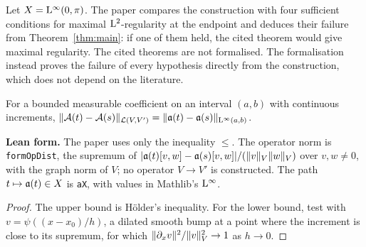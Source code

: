 Let $X=\mathrm{L}^\infty(0,\pi)$.  The paper compares the construction with four sufficient conditions
for maximal $\mathrm{L}^2$-regularity at the endpoint and deduces their failure from
Theorem~\ref{thm:main}: if one of them held, the cited theorem would give maximal regularity.
The cited theorems are not formalised.  The formalisation instead proves the failure of every
hypothesis directly from the construction, which does not depend on the literature.

\begin{lemma}
  \label{lem:opnorm}
  \leanok
  For a bounded measurable coefficient on an interval $(a,b)$ with continuous increments,
  $\lVert \mathcal{A}(t)-\mathcal{A}(s)\rVert_{\mathcal{L}(V,V')}=\lVert \mathfrak{a}(t)-\mathfrak{a}(s)\rVert_{\mathrm{L}^\infty(a,b)}$.
\end{lemma}

\textbf{Lean form.}  The paper uses only the inequality $\leq$.  The operator norm is
\texttt{formOpDist}, the supremum of
$\lvert \mathfrak{a}(t)[v,w]-\mathfrak{a}(s)[v,w]\rvert/(\lVert v\rVert_V\lVert w\rVert_V)$ over $v,w\neq0$, with the graph norm of
$V$; no operator $V\to V'$ is constructed.  The path $t\mapsto\mathfrak{a}(t)\in X$ is \texttt{aX}, with
values in Mathlib's $\mathrm{L}^\infty$.

\begin{proof}
  \leanok
  The upper bound is H\"older's inequality.  For the lower bound, test with
  $v=\psi((x-x_0)/h)$, a dilated smooth bump at a point where the increment is close to its
  supremum, for which $\lVert \partial_xv\rVert^2/\lVert v\rVert_V^2\to1$ as $h\to0$.
\end{proof}


